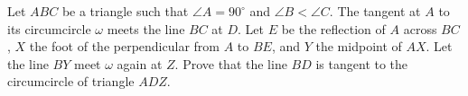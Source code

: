 Let $ABC$ be a triangle such that $\angle A = 90^{\circ}$ and $\angle B < \angle C$. The tangent at $A$ to its circumcircle $\omega$ meets the line $BC$ at $D$. Let $E$ be the reflection of $A$ across $BC$, $X$ the foot of the perpendicular from $A$ to $BE$, and $Y$ the midpoint of $AX$. Let the line $BY$ meet $\omega$ again at $Z$. Prove that the line $BD$ is tangent to the circumcircle of triangle $ADZ$.
